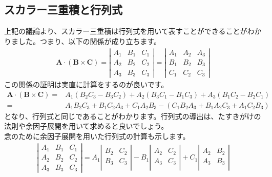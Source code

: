 \documentclass{ltjarticle}
\begin{document}
    \subsection{スカラー三重積と行列式}
    上記の議論より、スカラー三重積は行列式を用いて表すことができることがわかりました。つまり、以下の関係が成り立ちます。
    \begin{align*}
        \bm{A}\cdot\left(\bm{B}\times\bm{C}\right)
        =
        \left|
        \begin{array}{ccc}
            A_1 & B_1 & C_1 \\
            A_2 & B_2 & C_2 \\
            A_3 & B_3 & C_3 
        \end{array}
        \right|
        =
        \left|
        \begin{array}{ccc}
            A_1 & A_2 & A_3 \\
            B_1 & B_2 & B_3 \\
            C_1 & C_2 & C_3 
        \end{array}
        \right|    
    \end{align*}
    この関係の証明は実直に計算をするのが良いです。
    \begin{align*}
        \bm{A}\cdot\left(\bm{B}\times\bm{C}\right)
        =&
        A_1\left(B_2C_3 - B_3C_2\right) +
        A_2\left(B_3C_1 - B_1C_3\right) +
        A_3\left(B_1C_2 - B_2C_1\right) \\
        =& A_1B_2C_3 + B_1C_2A_3 + C_1A_2B_3
        - \left(C_1B_2A_3 + B_1A_2C_3 + A_1C_2B_3\right)
    \end{align*}
    となり、行列式と同じであることがわかります。行列式の導出は、たすきがけの法則や余因子展開を用いて求めると良いでしょう。\\
    念のために余因子展開を用いた行列式の計算も示します。
    \begin{align}
        \left|
        \begin{array}{ccc}
            A_1 & B_1 & C_1 \\
            A_2 & B_2 & C_2 \\
            A_3 & B_3 & C_3 
        \end{array}
        \right|
        = 
        A_1
        \left|
        \begin{array}{cc}
            B_2 & C_2 \\
            B_3 & C_3 \\
        \end{array}
        \right|
        - B_1
        \left|
        \begin{array}{cc}
            A_2 & C_2 \\
            A_3 & C_3 \\
        \end{array}
        \right|
        + C_1
        \left|
        \begin{array}{cc}
            A_2 & B_2 \\
            A_3 & B_3 \\
        \end{array}
        \right|                
    \end{align}
\end{document}
